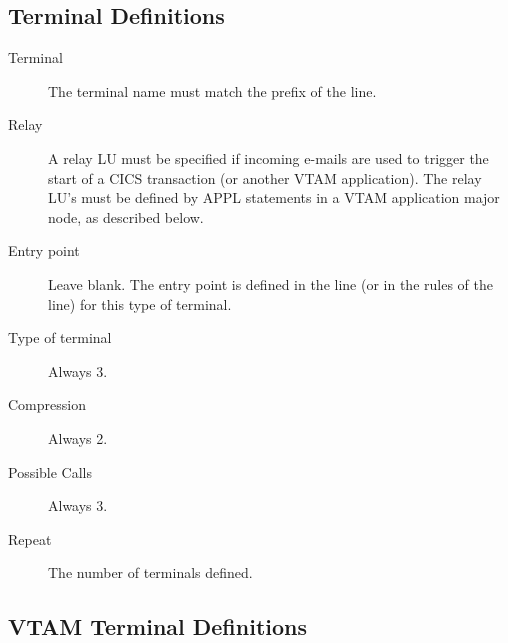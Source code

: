 \documentclass[letterpaper,10pt,english]{sphinxmanual}
\begin{document}
\subsection{Terminal Definitions}
\label{\detokenize{connectivity_guide:index-19}}\label{\detokenize{connectivity_guide:id4}}\begin{description}
\item[{Terminal}] \leavevmode
The terminal name must match the prefix of the line.

\item[{Relay}] \leavevmode
A relay LU must be specified if incoming e-mails are used to trigger the start of a CICS transaction (or another VTAM application). The relay LU’s must be defined by APPL statements in a VTAM application major node, as described below.

\item[{Entry point}] \leavevmode
Leave blank. The entry point is defined in the line (or in the rules of the line) for this type of terminal.

\item[{Type of terminal}] \leavevmode
Always 3.

\item[{Compression}] \leavevmode
Always 2.

\item[{Possible Calls}] \leavevmode
Always 3.

\item[{Repeat}] \leavevmode
The number of terminals defined.

\end{description}

\ignorespaces 

\subsection{VTAM Terminal Definitions}
\label{\detokenize{connectivity_guide:index-20}}\label{\detokenize{connectivity_guide:id5}}
\begin{sphinxVerbatim}[commandchars=\\\{\}]
  
  
  
  
\end{sphinxVerbatim}
\end{document}
